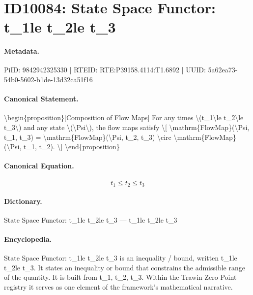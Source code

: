 \section*{ID10084: State Space Functor: t\_1le t\_2le t\_3}
\paragraph{Metadata.}
PiID: 9842942325330 | RTEID: RTE:P39158.4114:T1.6892 | UUID: 5a62ea73-54b0-5602-b1de-13d32ca51f16

\paragraph{Canonical Statement.}
\textbackslash{}begin\{proposition\}[Composition of Flow Maps] For any times \textbackslash{}(t\_1\textbackslash{}le t\_2\textbackslash{}le t\_3\textbackslash{}) and any state \textbackslash{}(\textbackslash{}Psi\textbackslash{}), the flow maps satisfy \textbackslash{}[ \textbackslash{}mathrm\{FlowMap\}(\textbackslash{}Psi, t\_1, t\_3) = \textbackslash{}mathrm\{FlowMap\}(\textbackslash{}Psi, t\_2, t\_3) \textbackslash{}circ \textbackslash{}mathrm\{FlowMap\}(\textbackslash{}Psi, t\_1, t\_2). \textbackslash{}] \textbackslash{}end\{proposition\}

\paragraph{Canonical Equation.}
\[
t_1\le t_2\le t_3
\]

\paragraph{Dictionary.}
State Space Functor: t\_1le t\_2le t\_3 — t\_1le t\_2le t\_3

\paragraph{Encyclopedia.}
State Space Functor: t\_1le t\_2le t\_3 is an inequality / bound, written t\_1le t\_2le t\_3. It states an inequality or bound that constrains the admissible range of the quantity. It is built from t\_1, t\_2, t\_3. Within the Trawin Zero Point registry it serves as one element of the framework's mathematical narrative.
